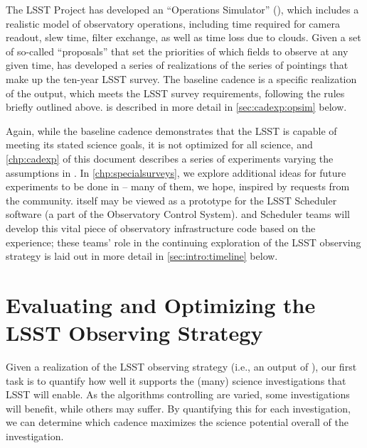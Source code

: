 The LSST Project has developed an ``Operations Simulator'' (\OpSim),
which
includes a realistic model of observatory operations, including time
required for camera readout, slew time, filter exchange, as well as time
loss due to clouds.  Given a set of so-called ``proposals''
that set the priorities of which fields to
observe at any given time, \OpSim has developed a series of realizations
of the series of pointings that make up the ten-year LSST survey.
The baseline cadence is a specific realization of the
\OpSim output, which meets the LSST survey requirements, following the
rules briefly outlined above. \OpSim is described in more detail in \autoref{sec:cadexp:opsim} below.

Again, while the baseline cadence demonstrates that the LSST is capable
of meeting its stated science goals, it is not optimized for all
science, and \autoref{chp:cadexp} of this document describes a
series of experiments varying the assumptions in \OpSim.  In
\autoref{chp:specialsurveys}, we explore additional ideas for future
experiments to be done in \OpSim -- many of them, we hope, inspired by
requests from the community.
\OpSim itself may be viewed as a prototype for the LSST Scheduler
software (a part of the Observatory Control System).  \OpSim and Scheduler teams
will develop this vital piece of observatory infrastructure code based on the \OpSim experience; these
teams' role in the continuing exploration of the LSST observing strategy
is laid out in more detail in \autoref{sec:intro:timeline} below.

\navigationbar


\section{Evaluating and Optimizing the LSST Observing Strategy}
\def\secname{intro:evaluation}\label{sec:\secname}


Given a realization of the LSST observing strategy (i.e., an output of
\OpSim), our first task is to quantify how well it supports the (many)
science investigations that LSST will enable.  As the algorithms controlling
\OpSim are varied, some investigations will benefit, while others may suffer.
By quantifying this for each investigation, we can determine which cadence
maximizes the science potential overall of the investigation.

